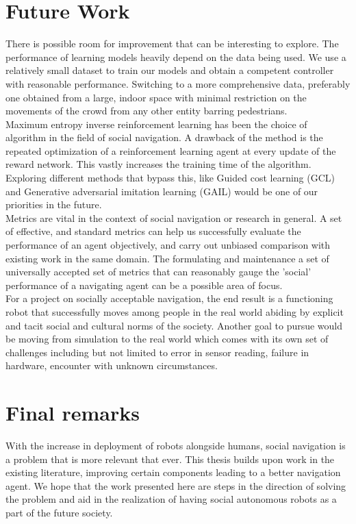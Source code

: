 \section{Future Work}
There is possible room for improvement that can be interesting to explore. The performance of learning models heavily depend on the data being used. We use a relatively small dataset to train our models and obtain a competent controller with reasonable performance. Switching to a more comprehensive data, preferably one obtained from a large, indoor space with minimal restriction on the movements of the crowd from any other entity barring pedestrians. 
\\
Maximum entropy inverse reinforcement learning has been the choice of algorithm in the field of social navigation. A drawback of the method is the repeated optimization of a reinforcement learning agent at every update of the reward network. This vastly increases the training time of the algorithm. Exploring different methods that bypass this, like Guided cost learning (GCL) \cite{finn2016gcl} and Generative adversarial imitation learning (GAIL) \cite{ho2016gail} would be one of our priorities in the future.  
\\
Metrics are vital in the context of social navigation or research in general. A set of effective, and standard metrics can help us successfully evaluate the performance of an agent objectively, and carry out unbiased comparison with existing work in the same domain. The formulating and maintenance a set of universally accepted set of metrics that can reasonably gauge the 'social' performance of a navigating agent can be a possible area of focus.
\\
For a project on socially acceptable navigation, the end result is a functioning robot that successfully moves among people in the real world abiding by explicit and tacit social and cultural norms of the society. Another goal to pursue would be moving from simulation to the real world which comes with its own set of challenges including but not limited to error in sensor reading, failure in hardware, encounter with unknown circumstances.
\\
\section{Final remarks}
With the increase in deployment of robots alongside humans, social navigation is a problem that is more relevant that ever. This thesis builds upon work in the existing literature, improving certain components leading to a better navigation agent. We hope that the work presented here are steps in the direction of solving the problem and aid in the realization of having social autonomous robots as a part of the future society.

